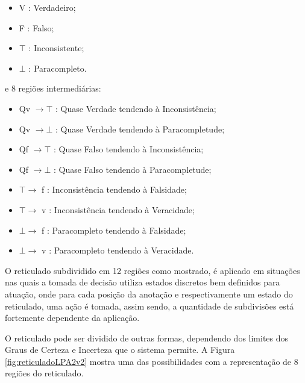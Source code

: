 \begin{itemize}
\item V : Verdadeiro;
\item F : Falso;
\item $\top$ : Inconsistente;
\item $\bot$ : Paracompleto.
\end{itemize}
e 8 regiões intermediárias: 
\begin{itemize}
\item Qv $\rightarrow  \top$ : Quase Verdade tendendo à Inconsistência;
\item Qv $\rightarrow  \bot$ : Quase Verdade tendendo à  Paracompletude;
\item Qf $\rightarrow  \top$ : Quase Falso tendendo à Inconsistência;
\item Qf $\rightarrow  \bot$ : Quase Falso tendendo à Paracompletude;
\item $\top \rightarrow $ f : Inconsistência tendendo à Falsidade;
\item $\top \rightarrow $ v : Inconsistência tendendo à Veracidade;
\item $\bot \rightarrow $ f : Paracompleto tendendo à Falsidade;
\item $\bot \rightarrow $ v : Paracompleto tendendo à Veracidade.

\end{itemize}

O reticulado subdividido em 12 regiões como mostrado, é aplicado em situações nas quais a tomada de decisão utiliza estados discretos bem definidos para atuação, onde para cada posição da anotação e respectivamente um estado do reticulado, uma ação é tomada, assim sendo, a quantidade de subdivisões está fortemente dependente da aplicação.


O reticulado pode ser dividido de outras formas, dependendo dos limites dos Graus de Certeza e Incerteza que o sistema permite. A Figura \ref{fig:reticuladoLPA2v2} mostra uma das possibilidades com a representação de 8 regiões do reticulado. 


